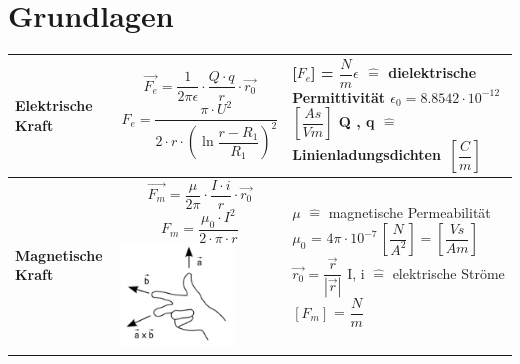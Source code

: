 \section{Grundlagen}
\renewcommand{\arraystretch}{2.5}
\begin{tabular}{| C{4cm} | P{6cm} | P{7cm} |}
\firsthline
\textbf{Elektrische Kraft} \newline {}  & \begin{equation*}
\vec{F_e} = \dfrac{1}{2\pi\epsilon}\cdot\dfrac{Q\cdot q}{r}\cdot\vec{r_0}
\end{equation*} \begin{equation*}
F_e = \dfrac{\pi\cdot U^2}{2\cdot r\cdot(\ln{\dfrac{r-R_1}{R_1}})^2}
\end{equation*} & [${F_e}$] = $\dfrac{N}{m}$\newline \newline $\epsilon$ $\widehat{=}$ dielektrische Permittivität \newline $\epsilon_0 = 8.8542 \cdot 10^{-12}$ $\left[\dfrac{As}{Vm}\right]$ \newline \newline Q , q $\widehat{=}$  Linienladungsdichten $\, \left[\dfrac{C}{m}\right]$ \\
\hline
\textbf{Magnetische Kraft} \newline {}  &	\begin{equation*}
\vec{F_m} = \dfrac{\mu}{2\pi}\cdot\dfrac{I\cdot i}{r}\cdot\vec{r_0}
\end{equation*} \begin{equation*}
F_m = \dfrac{\mu_0\cdot I^2}{2\cdot\pi\cdot r}
\end{equation*}  \includegraphics[width=3cm]{images/vektorprodukt.png}	& $\mu$ $\widehat{=}$ magnetische Permeabilität \newline $\mu_0$ = $4\pi\cdot 10^{-7} \,\left[\dfrac{N}{A^2}\right]=\left[\dfrac{Vs}{Am}\right]$ \newline \newline $\vec{r_0}=\dfrac{\vec{r}}{|\vec{r}|}$ \newline \newline I, i $\widehat{=}$ elektrische Ströme 	\newline \newline $[F_m]$ = $\dfrac{N}{m}$	\\

\end{tabular}
